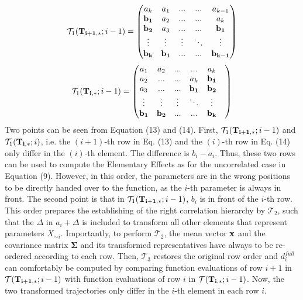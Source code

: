 \documentclass[a4paper,12pt]{article}
\begin{document}
\begin{align}
\mathcal{T}_1(\bold{T_{i+1,*}}; i-1)
=
\begin{pmatrix}
a_k & a_1 & ... & ... &  a_{k-1} \\
\bold{b_1} & a_2 & ... & ... &  a_k \\
\bold{b_2} & a_3 & ... & ... &  \bold{b_1} \\
\vdots & \vdots & \vdots & 	\ddots &  \vdots\\
\bold{b_k} & \bold{b_{1}} & ... & ... &  \bold{b_{k-1}}
\end{pmatrix}
\end{align}
\begin{align}
\mathcal{T}_1(\bold{T_{i,*}}; i-1)=
\begin{pmatrix}
a_1 & a_2 & ... & ... &  a_k \\
a_2 & ... & ... &  a_k & \bold{b_1} \\
a_3 & ... & ... &  \bold{b_1} & \bold{b_2} & \\
\vdots & \vdots & \vdots & 	\ddots &  \vdots\\
\bold{b_1} & \bold{b_{2}} & ... & ... &  \bold{b_{k}}
\end{pmatrix}
\end{align}
Two points can be seen from Equation (13) and (14). First, $\mathcal{T}_1(\bold{T_{i+1,*}}; i-1)$ and $\mathcal{T}_1(\bold{T_{i,*}}; i)$, i.e. the $(i+1)$-th row in Eq. (13) and the $(i)$-th row in Eq. (14) only differ in the $(i)$-th element. The difference is $b_i - a_i$. Thus, these two rows can be used to compute the Elementary Effects as for the uncorrelated case in Equation (9). However, in this order, the parameters are in the wrong positions to be directly handed over to the function, as the $i$-th parameter is always in front. The second point is that in $\mathcal{T}_1(\bold{T_{i+1,*}}; i-1)$, $b_i$ is in front of the $i$-th row. This order prepares the establishing of the right correlation hierarchy by $\mathcal{T}_2$, such that the $\Delta$ in $a_i + \Delta$ is included to transform all other elements that represent parameters $X_{\sim i}$. Importantly, to perform $\mathcal{T}_2$, the mean vector $\bold{x}$ and the covariance matrix $\pmb{\Sigma}$ and its transformed representatives have always to be re-ordered according to each row. 
Then, $\mathcal{T}_3$ restores the original row order and $d_i^{full}$ can comfortably be computed by comparing function evaluations of row $i+1$ in $\mathcal{T}(\bold{T_{i+1,*}}; i-1)$ with function evaluations of row $i$ in $\mathcal{T}(\bold{T_{i,*}}; i-1)$. Now, the two transformed trajectories only differ in the $i$-th element in each row $i$. \\
\end{document}

